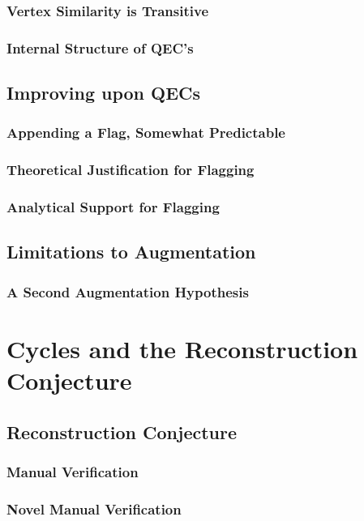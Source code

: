 \documentclass[11pt,a4paper]{report}
\begin{document}
\subsection{Vertex Similarity is Transitive}
\subsection{Internal Structure of QEC's}

\section{Improving upon QECs}
\subsection{Appending a Flag, Somewhat Predictable}
\subsection{Theoretical Justification for Flagging}
\subsection{Analytical Support for Flagging}

\section{Limitations to Augmentation}
\subsection{A Second Augmentation Hypothesis}


\chapter{Cycles and the Reconstruction Conjecture}

\section{Reconstruction Conjecture}

\subsection{Manual Verification}
\subsection{Novel Manual Verification}
\end{document}
